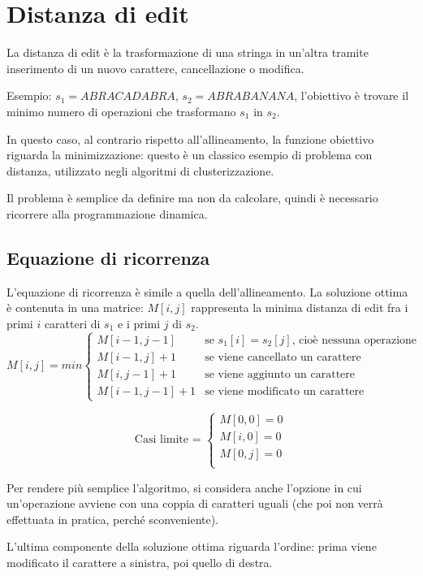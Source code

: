 \section{Distanza di edit}
La distanza di edit è la trasformazione di una stringa in un'altra tramite inserimento di un nuovo carattere, cancellazione o modifica.

Esempio: $s_1 = ABRACADABRA$, $s_2 = ABRABANANA$, l'obiettivo è trovare il minimo numero di operazioni che trasformano $s_1$ in $s_2$. 

In questo caso, al contrario rispetto all'allineamento, la funzione obiettivo riguarda la minimizzazione: questo è un classico esempio di problema con distanza, utilizzato negli algoritmi di clusterizzazione. 

Il problema è semplice da definire ma non da calcolare, quindi è necessario ricorrere alla programmazione dinamica. 

\subsection{Equazione di ricorrenza}
L'equazione di ricorrenza è simile a quella dell'allineamento. La soluzione ottima è contenuta in una matrice: $M[i, j]$ rappresenta la minima distanza di edit fra i primi $i$ caratteri di $s_1$ e i primi $j$ di $s_2$. 
$$M[i, j] = min \begin{cases}
M[i-1, j-1] & \textrm{se } s_1[i] = s_2[j] \textrm{, cioè nessuna operazione} \\
M[i-1, j] + 1 & \textrm{se viene cancellato un carattere} \\
M[i, j-1] + 1 & \textrm{se viene aggiunto un carattere} \\
M[i-1, j-1] + 1 & \textrm{se viene modificato un carattere}
\end{cases}$$

$$\textrm{Casi limite = }\begin{cases}
	M[0, 0] = 0 \\
	M[i, 0] = 0 \\
	M[0, j] = 0 \\
\end{cases}$$

Per rendere più semplice l'algoritmo, si considera anche l'opzione in cui un'operazione avviene con una coppia di caratteri uguali (che poi non verrà effettuata in pratica, perché sconveniente).

L'ultima componente della soluzione ottima riguarda l'ordine: prima viene modificato il carattere a sinistra, poi quello di destra. 

